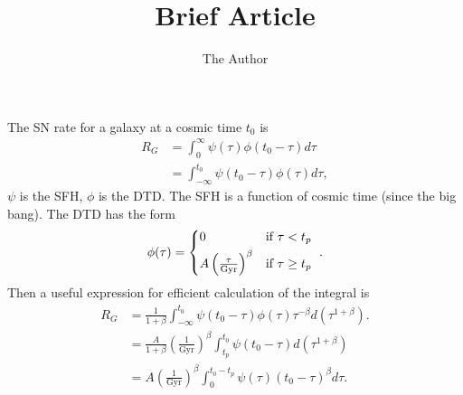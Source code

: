 \documentclass[11pt, oneside]{article}   	%
\title{Brief Article}
\author{The Author}
\begin{document}
\maketitle
The SN rate for a galaxy at a cosmic time $t_0$ is
\begin{align}
R_G &= \int_{0}^{\infty} \psi(\tau) \phi(t_0-\tau) d\tau \\
 &= \int_{-\infty}^{t_0} \psi(t_0-\tau) \phi(\tau) d\tau,
\end{align}
$\psi$ is the SFH, $\phi$ is the DTD. 
The SFH is a function of cosmic time (since the big bang).
The DTD has the form
\begin{equation}
\phi(\tau) =  
\begin{cases*} 
            0  &  if $\tau < t_p$  \\
             A \left(\frac{\tau}{\mathrm{Gyr}} \right)^\beta  & if $\tau \geq t_p$ 
          \end{cases*}.
\end{equation}
Then a useful expression for efficient calculation of the integral is
\begin{align}
R_G &= \frac{1}{1+\beta}  \int_{-\infty}^{t_0} \psi(t_0-\tau)  \phi(\tau)\tau^{-\beta}  d(\tau^{1+\beta}). \\
 &= \frac{A}{1+\beta}  \left(\frac{1}{\mathrm{Gyr}} \right)^\beta \int_{t_p}^{t_0} \psi(t_0-\tau) d(\tau^{1+\beta}) \\
 & = A   \left(\frac{1}{\mathrm{Gyr}} \right)^\beta  \int_{0}^{t_0-t_p} \psi(\tau) (t_0-\tau)^{\beta} d\tau .
 \end{align}
\end{document}
